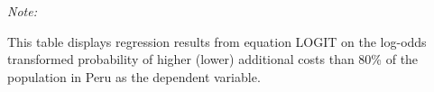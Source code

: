 \begin{table}[htbp!]
\begin{adjustbox}{width = 1\textwidth, max height = 0.95\textheight, center}
\begin{threeparttable}[b]
         \begin{tablenotes}\item \medskip \textit{Note:}
            \item This table displays regression results from equation LOGIT on the log-odds transformed probability of higher (lower) additional costs than 80\% of the population in Peru as the dependent variable. 
         \end{tablenotes}
      \end{threeparttable}
   \end{adjustbox}
\end{table}


